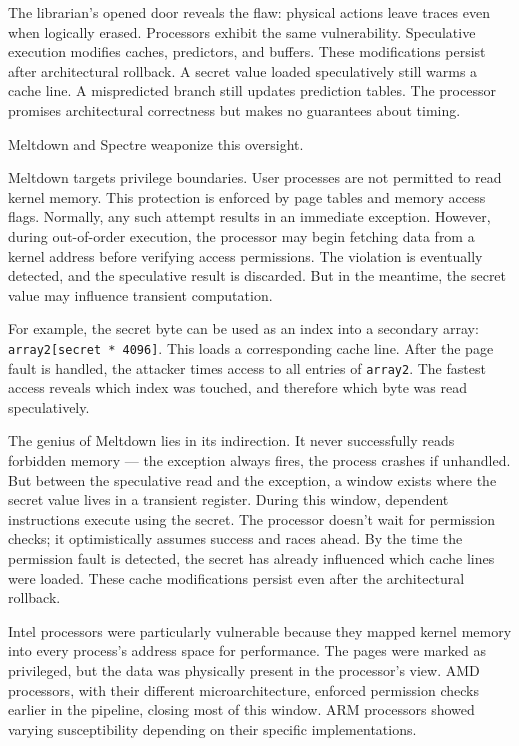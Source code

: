The librarian's opened door reveals the flaw: physical actions leave traces even when logically erased. Processors exhibit the same vulnerability. Speculative execution modifies caches, predictors, and buffers. These modifications persist after architectural rollback. A secret value loaded speculatively still warms a cache line. A mispredicted branch still updates prediction tables. The processor promises architectural correctness but makes no guarantees about timing.

Meltdown and Spectre weaponize this oversight.

Meltdown targets privilege boundaries. User processes are not permitted to read kernel memory. This protection is enforced by page tables and memory access flags. Normally, any such attempt results in an immediate exception. However, during out-of-order execution, the processor may begin fetching data from a kernel address before verifying access permissions. The violation is eventually detected, and the speculative result is discarded. But in the meantime, the secret value may influence transient computation.

For example, the secret byte can be used as an index into a secondary array: \texttt{array2[secret * 4096]}. This loads a corresponding cache line. After the page fault is handled, the attacker times access to all entries of \texttt{array2}. The fastest access reveals which index was touched, and therefore which byte was read speculatively.

The genius of Meltdown lies in its indirection. It never successfully reads forbidden memory — the exception always fires, the process crashes if unhandled. But between the speculative read and the exception, a window exists where the secret value lives in a transient register. During this window, dependent instructions execute using the secret. The processor doesn't wait for permission checks; it optimistically assumes success and races ahead. By the time the permission fault is detected, the secret has already influenced which cache lines were loaded. These cache modifications persist even after the architectural rollback.

Intel processors were particularly vulnerable because they mapped kernel memory into every process's address space for performance. The pages were marked as privileged, but the data was physically present in the processor's view. AMD processors, with their different microarchitecture, enforced permission checks earlier in the pipeline, closing most of this window. ARM processors showed varying susceptibility depending on their specific implementations.

